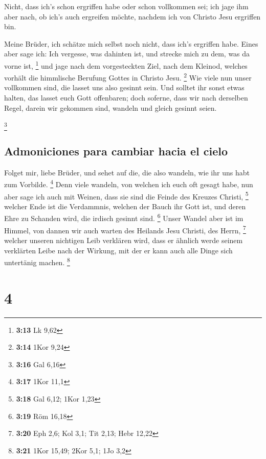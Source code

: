  Nicht, dass ich's schon ergriffen habe oder schon
vollkommen sei; ich jage ihm aber nach, ob ich's auch ergreifen möchte,
nachdem ich von Christo Jesu ergriffen bin.

 Meine Brüder, ich schätze mich selbst noch nicht, dass
ich's ergriffen habe. Eines aber sage ich: Ich vergesse, was dahinten
ist, und strecke mich zu dem, was da vorne ist, \footnote{\textbf{3:13}
  Lk 9,62}  und jage nach dem vorgesteckten Ziel, nach
dem Kleinod, welches vorhält die himmlische Berufung Gottes in Christo
Jesu. \footnote{\textbf{3:14} 1Kor 9,24}  Wie viele nun
unser vollkommen sind, die lasset uns also gesinnt sein. Und solltet ihr
sonst etwas halten, das lasset euch Gott offenbaren; 
doch soferne, dass wir nach derselben Regel, darein wir gekommen sind,
wandeln und gleich gesinnt seien.

\footnote{\textbf{3:16} Gal 6,16}

\hypertarget{admoniciones-para-cambiar-hacia-el-cielo}{%
\subsection{Admoniciones para cambiar hacia el
cielo}\label{admoniciones-para-cambiar-hacia-el-cielo}}

 Folget mir, liebe Brüder, und sehet auf die, die also
wandeln, wie ihr uns habt zum Vorbilde. \footnote{\textbf{3:17} 1Kor
  11,1}  Denn viele wandeln, von welchen ich euch oft
gesagt habe, nun aber sage ich auch mit Weinen, dass sie sind die Feinde
des Kreuzes Christi, \footnote{\textbf{3:18} Gal 6,12; 1Kor 1,23}
 welcher Ende ist die Verdammnis, welchen der Bauch ihr
Gott ist, und deren Ehre zu Schanden wird, die irdisch gesinnt sind.
\footnote{\textbf{3:19} Röm 16,18}  Unser Wandel aber ist
im Himmel, von dannen wir auch warten des Heilands Jesu Christi, des
Herrn, \footnote{\textbf{3:20} Eph 2,6; Kol 3,1; Tit 2,13; Hebr 12,22}
 welcher unseren nichtigen Leib verklären wird, dass er
ähnlich werde seinem verklärten Leibe nach der Wirkung, mit der er kann
auch alle Dinge sich untertänig machen. \footnote{\textbf{3:21} 1Kor
  15,49; 2Kor 5,1; 1Jo 3,2}

\hypertarget{section-3}{%
\section{4}\label{section-3}}

